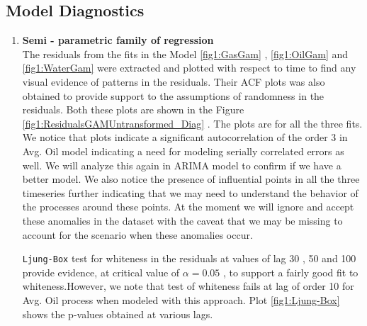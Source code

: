 \documentclass[a4paper]{article}
\begin{document}
\subsection{Model Diagnostics}
\begin{enumerate}
	\item  \textbf{Semi - parametric family of regression ~\cite{RJC2009}  ~\cite{Gam-R-mgcv} }\\

The residuals from the fits in the Model \ref{fig1:GasGam} , \ref{fig1:OilGam} and \ref{fig1:WaterGam} were extracted and plotted 
with respect to time to find any visual evidence of patterns in the residuals. Their ACF plots was also obtained to provide support to the assumptions of randomness in the residuals. Both these plots are shown in the Figure \ref{fig1:ResidualsGAMUntransformed_Diag} . The plots are for all the three fits. We notice that plots indicate a significant autocorrelation of the order 3 in Avg. Oil model indicating a need for modeling serially correlated errors as well. We will analyze this again in ARIMA model to confirm if we have a better model. We also notice the presence of influential points in all the three timeseries further indicating that we may need to understand the behavior of the processes around these points. At the moment we will ignore and accept these anomalies in the dataset with the caveat that we may be missing to account for the scenario
when these anomalies occur.

\verb|Ljung-Box| test for whiteness in the residuals at values of lag 30 , 50 and 100 provide evidence, at critical value of $\alpha = 0.05$ , to support a fairly good fit to whiteness.However, we note that test of whiteness fails at lag of order 10 for Avg. Oil process when modeled with this approach. Plot \ref{fig1:Ljung-Box} shows the p-values obtained at various lags. 



\end{enumerate}
\end{document}
